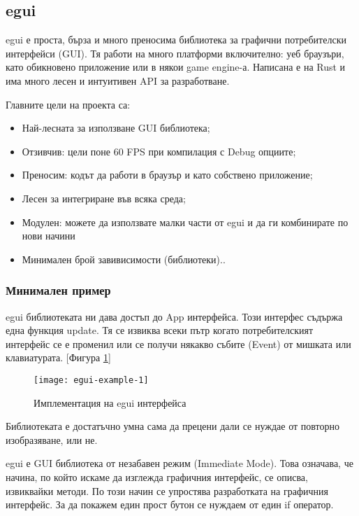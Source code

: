 \subsection{egui}
egui е проста, бърза и много преносима библиотека за графични потребителски
интерфейси (GUI). Тя работи на много платформи включително: уеб браузъри, като
обикновено приложение или в някои game engine-а. Написана е на Rust и има много
лесен и интуитивен API за разработване.

Главните цели на проекта са:
\begin{itemize}
    \item Най-лесната за използване GUI библиотека;
    \item Отзивчив: цели поне 60 FPS при компилация с Debug опциите;
    \item Преносим: кодът да работи в браузър и като собствено приложение;
    \item Лесен за интегриране във всяка среда;
    \item Модулен: можете да използвате малки части от egui и да ги комбинирате
    по нови начини \item Минимален брой завивисимости (библиотеки)..
\end{itemize}

\subsubsection{Минимален пример}
egui библиотеката ни дава достъп до App интерфейса. Този интерфес съдържа една
функция update. Тя се извиква всеки пътр когато потребителският интерфейс се е
променил или се получи някакво събите (Event) от мишката или клавиатурата. 
[Фигура \ref{fig:egui-example-1}]

\begin{figure}[!htb]
  \texttt{[image: egui-example-1]}
  \centering
  \caption{Имплементация на egui интерфейса}
  \label{fig:egui-example-1}
\end{figure}

Библиотеката е достатъчно умна сама да прецени дали се нуждае от повторно
изобразяване, или не.

egui е GUI библиотека от незабавен режим (Immediate Mode). Това означава, че
начина, по който искаме да изглежда графичния интерфейс, се описва, извиквайки
методи. По този начин се упростява разработката на графичния интерфейс. За да покажем един прост
бутон се нуждаем от един if оператор.
